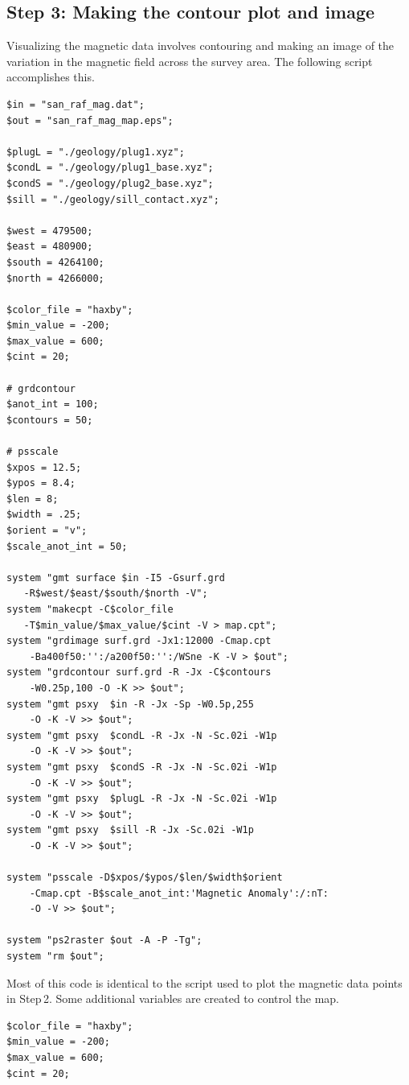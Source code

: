 \documentclass[letterpaper,10pt]{report}
\begin{document}
\subsection*{Step 3: Making the contour plot and image}
Visualizing the magnetic data involves contouring and making an image of the variation in the magnetic field across the survey area. The following script accomplishes this.
\begin{mdframed}[style=MyFrame]
\begin{verbatim}
$in = "san_raf_mag.dat";
$out = "san_raf_mag_map.eps";

$plugL = "./geology/plug1.xyz";
$condL = "./geology/plug1_base.xyz";
$condS = "./geology/plug2_base.xyz";
$sill = "./geology/sill_contact.xyz";

$west = 479500;
$east = 480900;
$south = 4264100;
$north = 4266000;

$color_file = "haxby";
$min_value = -200;
$max_value = 600;
$cint = 20;

# grdcontour
$anot_int = 100;
$contours = 50;

# psscale
$xpos = 12.5;
$ypos = 8.4;
$len = 8;
$width = .25;
$orient = "v";
$scale_anot_int = 50;

system "gmt surface $in -I5 -Gsurf.grd 
   -R$west/$east/$south/$north -V";
system "makecpt -C$color_file 
   -T$min_value/$max_value/$cint -V > map.cpt";
system "grdimage surf.grd -Jx1:12000 -Cmap.cpt 
    -Ba400f50:'':/a200f50:'':/WSne -K -V > $out";
system "grdcontour surf.grd -R -Jx -C$contours 
    -W0.25p,100 -O -K >> $out";
system "gmt psxy  $in -R -Jx -Sp -W0.5p,255 
    -O -K -V >> $out";
system "gmt psxy  $condL -R -Jx -N -Sc.02i -W1p 
    -O -K -V >> $out";
system "gmt psxy  $condS -R -Jx -N -Sc.02i -W1p 
    -O -K -V >> $out";
system "gmt psxy  $plugL -R -Jx -N -Sc.02i -W1p 
    -O -K -V >> $out";
system "gmt psxy  $sill -R -Jx -Sc.02i -W1p 
    -O -K -V >> $out";

system "psscale -D$xpos/$ypos/$len/$width$orient 
    -Cmap.cpt -B$scale_anot_int:'Magnetic Anomaly':/:nT: 
    -O -V >> $out";

system "ps2raster $out -A -P -Tg";
system "rm $out";
\end{verbatim}
\end{mdframed}
Most of this code is identical to the script used to plot the magnetic data points in Step\,2. Some additional variables are created to control the map. 
\begin{verbatim}
$color_file = "haxby";
$min_value = -200;
$max_value = 600;
$cint = 20;
\end{verbatim}
\end{document}
